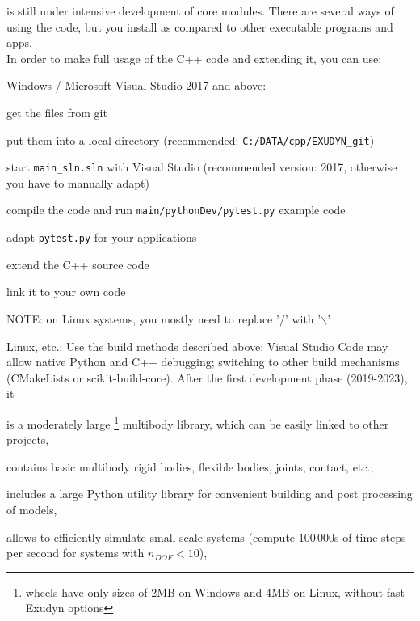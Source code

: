 \codeName is still under intensive development of core modules.
There are several ways of using the code, but you  install \codeName as compared to other executable programs and apps.
\vspace{6pt}\\
In order to make full usage of the C++ code and extending it, you can use:
\bi
  \item Windows / Microsoft Visual Studio 2017 and above:
  \bi
    \item get the files from git
    \item put them into a local directory (recommended: \texttt{C:/DATA/cpp/EXUDYN\_git})
    \item start \texttt{main\_sln.sln} with Visual Studio (recommended version: 2017, otherwise you have to manually adapt)
    \item compile the code and run \texttt{main/pythonDev/pytest.py} example code
    \item adapt \texttt{pytest.py} for your applications
    \item extend the C++ source code
    \item link it to your own code
    \item NOTE: on Linux systems, you mostly need to replace '$/$' with '$\backslash$'
  \ei
  \item Linux, etc.: Use the build methods described above; Visual Studio Code may allow native Python and C++ debugging; switching to other build mechanisms (CMakeLists or scikit-build-core).
\ei
%
After the first development phase (2019-2023), it
\bi
  \item is a moderately large \footnote{wheels have only sizes of 2MB on Windows and 4MB on Linux, without fast Exudyn options} multibody library, which can be easily linked to other projects,
  \item contains basic multibody rigid bodies, flexible bodies, joints, contact, etc.,
  \item includes a large Python utility library for convenient building and post processing of models,
  \item allows to efficiently simulate small scale systems (compute $100\,000$s of time steps per second for systems with $n_{DOF}<10$),
